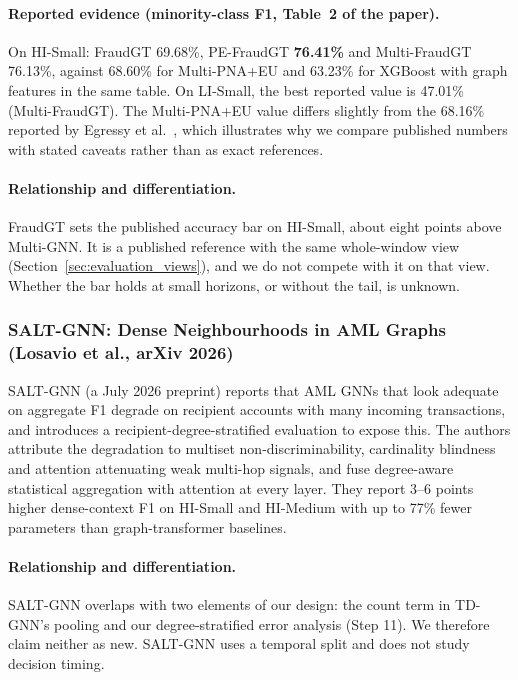\documentclass[11pt,a4paper]{article}
\begin{document}
\paragraph{Reported evidence (minority-class F1, Table~2 of the paper).} On HI-Small: FraudGT 69.68\%, PE-FraudGT \textbf{76.41\%} and Multi-FraudGT 76.13\%, against 68.60\% for Multi-PNA+EU and 63.23\% for XGBoost with graph features in the same table. On LI-Small, the best reported value is 47.01\% (Multi-FraudGT). The Multi-PNA+EU value differs slightly from the 68.16\% reported by Egressy et al.\ \cite{egressy2024multigraph}, which illustrates why we compare published numbers with stated caveats rather than as exact references.

\paragraph{Relationship and differentiation.} FraudGT sets the published accuracy bar on HI-Small, about eight points above Multi-GNN. It is a published reference with the same whole-window view (Section~\ref{sec:evaluation_views}), and we do not compete with it on that view. Whether the bar holds at small horizons, or without the tail, is unknown.

\subsubsection{SALT-GNN: Dense Neighbourhoods in AML Graphs (Losavio et al., arXiv 2026)}
SALT-GNN \cite{losavio2026saltgnn} (a July 2026 preprint) reports that AML GNNs that look adequate on aggregate F1 degrade on recipient accounts with many incoming transactions, and introduces a recipient-degree-stratified evaluation to expose this. The authors attribute the degradation to multiset non-discriminability, cardinality blindness and attention attenuating weak multi-hop signals, and fuse degree-aware statistical aggregation with attention at every layer. They report 3--6 points higher dense-context F1 on HI-Small and HI-Medium with up to 77\% fewer parameters than graph-transformer baselines.

\paragraph{Relationship and differentiation.} SALT-GNN overlaps with two elements of our design: the count term in TD-GNN's pooling and our degree-stratified error analysis (Step 11). We therefore claim neither as new. SALT-GNN uses a temporal split and does not study decision timing.
\end{document}
